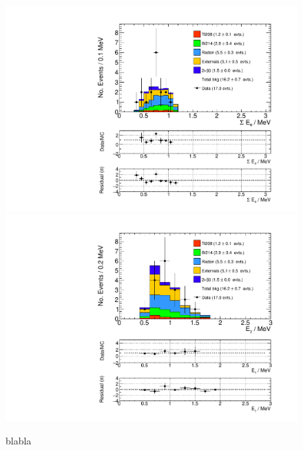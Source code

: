 \documentclass[main.tex]{subfiles}
\begin{document}
\begin{figure} [h!]
\begin{center}
\includegraphics[scale=0.5]{pictures/FinalResults/bb2nu2/150/SEe_bb2nu2NS.pdf}
\includegraphics[scale=0.5]{pictures/FinalResults/bb2nu2/150/Eg_bb2nu2NS.pdf}
\end{center}
\caption{blabla}
\label{plot:SEeAndEg250bb2nu2_150}
\end{figure}
\end{document}
